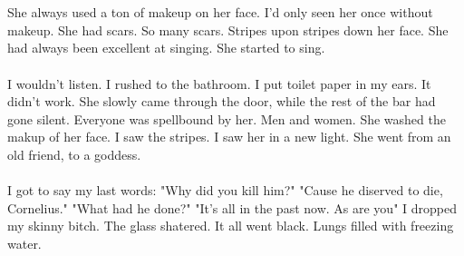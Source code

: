 \documentclass[]{article}
\begin{document}
	\\ \\
	She always used a ton of makeup on her face. I'd only seen her once without makeup. She had scars. So many scars. Stripes upon stripes down her face. She had always been excellent at singing. She started to sing.
	\\ \\
	I wouldn't listen. I rushed to the bathroom. I put toilet paper in my ears. It didn't work. She slowly came through the door, while the rest of the bar had gone silent. Everyone was spellbound by her. Men and women. She washed the makup of her face. I saw the stripes. I saw her in a new light. She went from an old friend, to a goddess. 
	\\ \\
	I got to say my last words: "Why did you kill him?" "Cause he diserved to die, Cornelius." "What had he done?" "It's all in the past now. As are you" I dropped my skinny bitch. The glass shatered. It all went black. Lungs filled with freezing water.
	
\end{document}
